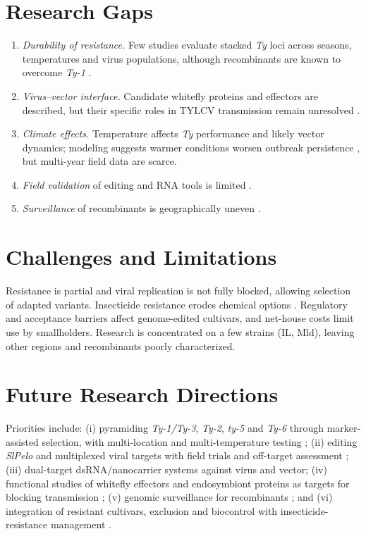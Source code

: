 \documentclass[journal]{IEEEtran}
\begin{document}
\section{Research Gaps}
\begin{enumerate}
\item \textit{Durability of resistance.} Few studies evaluate stacked \textit{Ty} loci across seasons, temperatures and virus populations, although recombinants are known to overcome \textit{Ty-1} \cite{elsappah2022,temp2021,med2023}.
\item \textit{Virus--vector interface.} Candidate whitefly proteins and effectors are described, but their specific roles in TYLCV transmission remain unresolved \cite{circ2021,effectors2021}.
\item \textit{Climate effects.} Temperature affects \textit{Ty} performance and likely vector dynamics; modeling suggests warmer conditions worsen outbreak persistence \cite{model2026}, but multi-year field data are scarce.
\item \textit{Field validation} of editing and RNA tools is limited \cite{pramanik2021,tabein2022,dsrna2021}.
\item \textit{Surveillance} of recombinants is geographically uneven \cite{marchant2023,med2023}.
\end{enumerate}

\section{Challenges and Limitations}
Resistance is partial and viral replication is not fully blocked, allowing selection of adapted variants. Insecticide resistance erodes chemical options \cite{insects2024,florida2023}. Regulatory and acceptance barriers affect genome-edited cultivars, and net-house costs limit use by smallholders. Research is concentrated on a few strains (IL, Mld), leaving other regions and recombinants poorly characterized.

\section{Future Research Directions}
Priorities include: (i) pyramiding \textit{Ty-1/Ty-3}, \textit{Ty-2}, \textit{ty-5} and \textit{Ty-6} through marker-assisted selection, with multi-location and multi-temperature testing \cite{elsappah2022,ty6_2024}; (ii) editing \textit{SlPelo} and multiplexed viral targets with field trials and off-target assessment \cite{pramanik2021}; (iii) dual-target dsRNA/nanocarrier systems against virus and vector; (iv) functional studies of whitefly effectors and endosymbiont proteins as targets for blocking transmission \cite{circ2021,effectors2021}; (v) genomic surveillance for recombinants \cite{marchant2023,med2023}; and (vi) integration of resistant cultivars, exclusion and biocontrol with insecticide-resistance management \cite{biocontrol2025,florida2023}.
\end{document}
